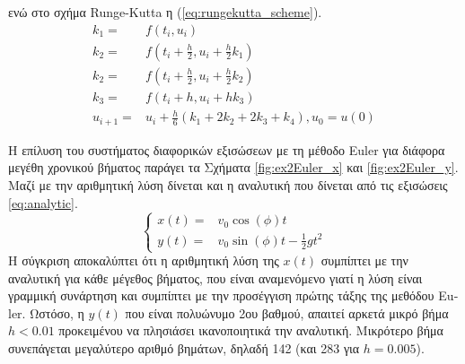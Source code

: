 \documentclass[assignment4.tex]{subfiles}
\begin{document}
ενώ στο σχήμα \textlatin{Runge-Kutta} η (\ref{eq:rungekutta_scheme}).
\begin{equation}
\begin{split}
k_1 =& f(t_i, u_i) \\
k_2 =& f(t_i+\frac{h}{2}, u_i+\frac{h}{2}k_1) \\
k_2 =& f(t_i+\frac{h}{2}, u_i+\frac{h}{2}k_2) \\
k_3 =& f(t_i+h, u_i + h k_3) \\
u_{i+1} =& u_i + \frac{h}{6}\left(k_1 + 2k_2 + 2k_3+ k_4\right), u_0=u(0)
\end{split}
\label{eq:rungekutta_scheme}
\end{equation}

Η επίλυση του συστήματος διαφορικών εξισώσεων με τη μέθοδο \textlatin{Euler} για διάφορα μεγέθη χρονικού βήματος παράγει τα Σχήματα \ref{fig:ex2Euler_x} και \ref{fig:ex2Euler_y}. Μαζί με την αριθμητική λύση δίνεται και η αναλυτική που δίνεται από τις εξισώσεις \ref{eq:analytic}.
\begin{equation}
\left\{
\begin{matrix}
x(t) =& v_0\cos(\phi) t \\
y(t) =& v_0\sin(\phi) t - \frac{1}{2}gt^2
\end{matrix}
\right.
\label{eq:analytic}
\end{equation}
Η σύγκριση αποκαλύπτει ότι η αριθμητική λύση της $x(t)$ συμπίπτει με την αναλυτική για κάθε μέγεθος βήματος, που είναι αναμενόμενο γιατί η λύση είναι γραμμική συνάρτηση και συμπίπτει με την προσέγγιση πρώτης τάξης της μεθόδου \textlatin{Euler}. Ωστόσο, η $y(t)$ που είναι πολυώνυμο 2ου βαθμού, απαιτεί αρκετά μικρό βήμα $h<0.01$ προκειμένου να πλησιάσει ικανοποιητικά την αναλυτική. Μικρότερο βήμα συνεπάγεται μεγαλύτερο αριθμό βημάτων, δηλαδή 142 (και 283 για $h=0.005$). 
\end{document}
